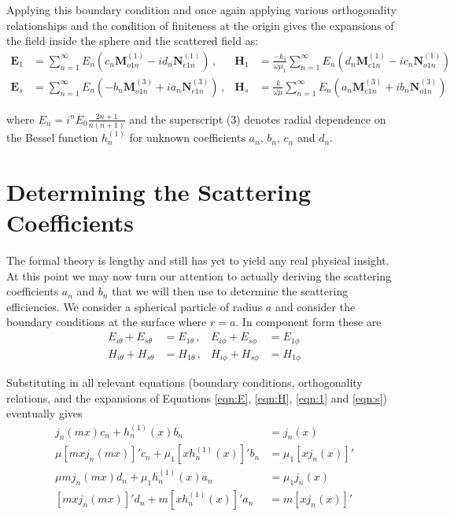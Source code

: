 {Applying this boundary condition and once again applying various orthogonality relationships and the condition of finiteness at the origin gives the expansions of the field inside the sphere and the scattered field as:
\begin{align}
\label{eqn:1}
\mathbf{E}_1 &= \sum _{n=1} ^{\infty} E_n (c_n\mathbf{M}_{o1n}^{(1)} - id_n\mathbf{N}_{e1n}^{(1)}) \, , &\mathbf{H}_1 &= \frac{-k_1}{\omega\mu_1} \sum _{n=1} ^{\infty}E_n(d_n\mathbf{M}_{e1n}^{(1)} - ic_n\mathbf{N}_{o1n}^{(1)}) \\
\label{eqn:s}
\mathbf{E}_s &= \sum _{n=1} ^{\infty} E_n (-b_n\mathbf{M}_{o1n}^{(3)} + ia_n\mathbf{N}_{e1n}^{(3)}) \,
 , &\mathbf{H}_s &= \frac{k}{\omega\mu} \sum _{n=1} ^{\infty}E_n(a_n\mathbf{M}_{e1n}^{(3)} + ib_n\mathbf{N}_{o1n}^{(3)}) 
\end{align}

\noindent where $E_n=i^n E_0  \frac{2n+1}{n(n+1)}$ and the superscript (3) denotes radial dependence on the Bessel function $h_n^{(1)}$ for unknown coefficients $a_n$, $b_n$, $c_n$ and $d_n$.

\section{Determining the Scattering Coefficients}

The formal theory is lengthy and still has yet to yield any real physical insight.  At this point we may now turn our attention to actually deriving the scattering coefficients $a_n$ and $b_n$ that we will then use to determine the scattering efficiencies.   We consider a spherical particle of radius $a$ and consider the boundary conditions at the surface where $r=a$.  In component form these are 
\begin{align}
E_{i\theta}+E_{s\theta}&=E_{1\theta}\, , & E_{i\phi}+E_{s\phi}&=E_{1\phi} \\
H_{i\theta}+H_{s\theta}&=H_{1\theta} \, , &H_{i\phi}+H_{s\phi}&=H_{1\phi} 
\end{align}

\noindent Substituting in all relevant equations (boundary conditions, orthogonality relations, and the expansions of Equations \ref{eqn:E}, \ref{eqn:H}, \ref{eqn:1} and \ref{eqn:s}) eventually gives
\begin{align}
j_n(mx)c_n+h^{(1)}_n(x)b_n&=j_n(x) \\
\mu[mxj_n(mx)]'c_n+\mu_1[xh_n^{(1)}(x)]'b_n&=\mu_1[xj_n(x)]' \\
\mu mj_n(mx)d_n+\mu_1h^{(1)}_n(x)a_n&=\mu_1j_n(x) \\
[mxj_n(mx)]'d_n+m[xh_n^{(1)}(x)]'a_n&=m[xj_n(x)]'
\end{align}

}
